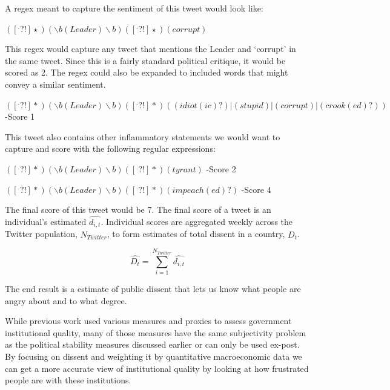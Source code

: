 \documentclass[12pt]{article}
\begin{document}
\begin{spacing}{1.5}
\noindent A regex meant to capture the sentiment of this tweet would look like:

\begin{center}
$([^.?!]\star)(\backslash b(Leader)\backslash b)([^.?!]\star)(corrupt)$
\end{center}

\noindent This regex would capture any tweet that mentions the Leader and ‘corrupt’ in the same tweet. Since this is a fairly standard political critique, it would be scored as 2. The regex could also be expanded to included words that might convey a similar sentiment.

\begin{center}
$([^.?!]*) (\backslash b(Leader)\backslash b)([^.?!]*)((idiot(ic)?)|(stupid)|(corrupt)|(crook(ed)?))$ -Score 1
\end{center}


\noindent This tweet also contains other inflammatory statements we would want to capture and score with the following regular expressions:  

\vspace{.5 em}

\begin{center}
$([^.?!]*)(\backslash b(Leader)\backslash b)([^.?!]*)(tyrant)$ -Score 2

\vspace{.5 em}

$([^.?!]*)(\backslash b(Leader)\backslash b)([^.?!]*)(impeach(ed)?)$ -Score 4
\end{center}


\noindent The final score of this tweet would be 7. The final score of a tweet is an individual's estimated $\hat{d_{i,t}}$. Individual scores are aggregated weekly across the Twitter population, $N_{Twitter}$, to form estimates of total dissent in a country, $\hat{D_t}$. 

\vspace{.5 em}
\begin{equation}
\hat{D_t}= \sum_{i=1}^{N_{Twitter}} \hat{d_{i,t}} 	
\end{equation}

\noindent The end result is a estimate of public dissent that lets us know what people are angry about and to what degree. 

While previous work used various measures and proxies to assess government institutional quality, many of those measures have the same subjectivity problem as the political stability measures discussed earlier or can only be used ex-post. By focusing on dissent and weighting it by quantitative macroeconomic data we can get a more accurate view of institutional quality by looking at how frustrated people are with these institutions. 


\end{spacing}
\end{document}
